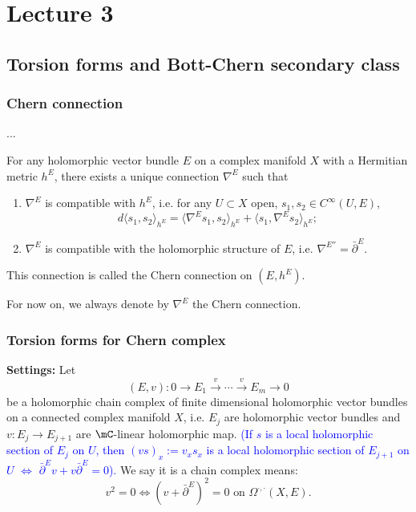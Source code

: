 \section{Lecture 3}
\label{sec:lecture-3}
\setcounter{equation}{0}
\subsection*{Torsion forms and Bott-Chern secondary class}
\subsubsection*{Chern connection}
...

\begin{theorem}
    For any holomorphic vector bundle $E$ on a complex manifold $X$ with 
    a Hermitian metric $h^E$, there exists a unique connection 
    $\nabla^E$ such that
    \begin{enumerate}
        \item $\nabla^E$ is compatible with $h^E$, i.e. for any 
        $U\subset X$ open, $s_1,s_2\in C^\infty(U,E)$, 
        \[
        d\langle s_1,s_2\rangle_{h^E} = 
        \langle\nabla^E s_1,s_2\rangle_{h^E} + 
        \langle s_1,\nabla^E s_2\rangle_{h^E};
        \]
        \item $\nabla^E$ is compatible with the holomorphic structure of 
        $E$, i.e. $\nabla^{E''}=\bar{\partial}^E$.
    \end{enumerate}
    This connection is called the Chern connection on $(E,h^E)$.
\end{theorem}

For now on, we always denote by $\nabla^E$ the Chern connection. 

\subsubsection*{Torsion forms for Chern complex}
\textbf{Settings:}
Let 
\[
(E,v):0\to E_1\overset{v}{\to}\cdots\overset{v}{\to}E_m\to0
\]
be a holomorphic chain complex of finite dimensional holomorphic vector 
bundles on a connected complex manifold $X$, i.e. $E_j$ are holomorphic 
vector bundles and $v:E_j\to E_{j+1}$ are $\mC$-linear holomorphic map. 
\textcolor{blue}{(If $s$ is a local holomorphic section of $E_j$ on $U$, 
then $(vs)_x:=v_xs_x$ is a local holomorphic section of $E_{j+1}$ on $U$ 
$\Longleftrightarrow$ $\bar{\partial}^{E}v+v\bar{\partial}^{E} = 0$).}
We say it is a chain complex means: 
\[
v^2=0\Longleftrightarrow(v+\bar{\partial}^{E})^2=0\text{ on }
\Omega^{\cdot,\cdot}(X,E).
\]

